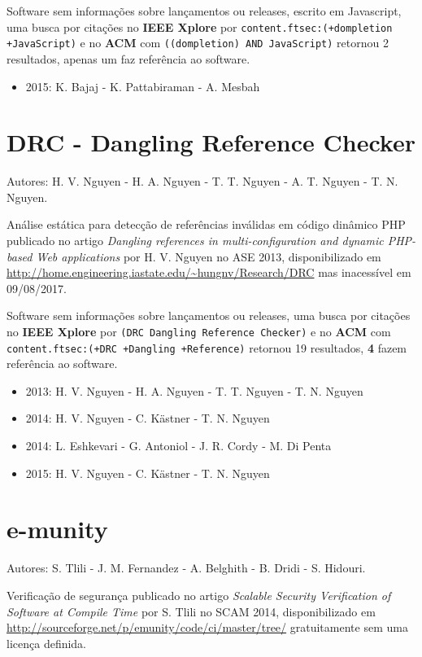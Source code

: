 Software sem informações sobre lançamentos ou releases,
escrito em Javascript,
uma busca por citações no {\bf IEEE Xplore} por
\texttt{content.ftsec:(+dompletion +JavaScript)}
e no {\bf ACM} com
\texttt{((dompletion) AND JavaScript)}
retornou
2 resultados,
apenas um faz referência ao software.

\begin{itemize}
\item 2015: K. Bajaj - K. Pattabiraman - A. Mesbah
\end{itemize}

\section{DRC - Dangling Reference Checker}

Autores:
H. V. Nguyen - H. A. Nguyen - T. T. Nguyen - A. T. Nguyen - T. N. Nguyen.

Análise estática para detecção de referências inválidas em código dinâmico PHP
publicado no artigo {\it Dangling references in multi-configuration and dynamic PHP-based Web applications}
por H. V. Nguyen
no ASE 2013,
disponibilizado em \url{http://home.engineering.iastate.edu/~hungnv/Research/DRC}
mas inacessível em 09/08/2017.

Software sem informações sobre lançamentos ou releases,
uma busca por citações no {\bf IEEE Xplore} por
\texttt{(DRC Dangling Reference Checker)}
e no {\bf ACM} com
\texttt{content.ftsec:(+DRC +Dangling +Reference)}
retornou
19 resultados,
{\bf 4} fazem referência ao software.

\begin{itemize}
\item 2013: H. V. Nguyen - H. A. Nguyen - T. T. Nguyen - T. N. Nguyen
\item 2014: H. V. Nguyen - C. K\"{a}stner - T. N. Nguyen
\item 2014: L. Eshkevari - G. Antoniol - J. R. Cordy - M. Di Penta
\item 2015: H. V. Nguyen - C. K\"{a}stner - T. N. Nguyen
\end{itemize}

\section{e-munity}

Autores:
S. Tlili - J. M. Fernandez - A. Belghith - B. Dridi - S. Hidouri.

Verificação de segurança
publicado no artigo {\it Scalable Security Verification of Software at Compile Time}
por S. Tlili
no SCAM 2014,
disponibilizado em \url{http://sourceforge.net/p/emunity/code/ci/master/tree/}
gratuitamente
sem uma licença definida.

